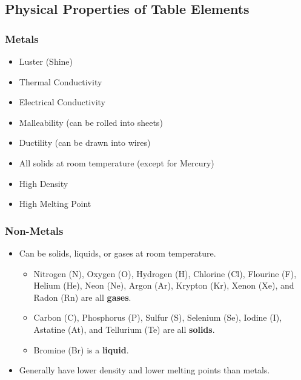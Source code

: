 \subsection{Physical Properties of Table Elements}

\subsubsection{Metals}

\begin{itemize}
\item Luster (Shine)
\item Thermal Conductivity
\item Electrical Conductivity
\item Malleability (can be rolled into sheets)
\item Ductility (can be drawn into wires)
\item All solids at room temperature (except for Mercury)
\item High Density
\item High Melting Point
\end{itemize}

\noindent
{}

\subsubsection{Non-Metals}

\noindent
{}

\begin{itemize}
\item Can be solids, liquids, or gases at room temperature.
	\begin{itemize}
	\item Nitrogen (N), Oxygen (O), Hydrogen (H), Chlorine (Cl), Flourine (F), Helium (He), Neon (Ne), Argon (Ar), Krypton (Kr), Xenon (Xe), and Radon (Rn) are all \textbf{gases}.
	\item Carbon (C), Phosphorus (P), Sulfur (S), Selenium (Se), Iodine (I), Astatine (At), and Tellurium (Te) are all \textbf{solids}.
	\item Bromine (Br) is a \textbf{liquid}.
	\end{itemize}
\item Generally have lower density and lower melting points than metals.
\end{itemize}

